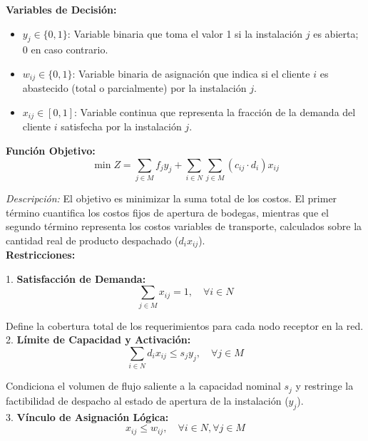 \documentclass[letter, 10pt]{article}
\begin{document}
\textbf{Variables de Decisión:}
\begin{itemize}
    \item $y_j \in \{0, 1\}$: Variable binaria que toma el valor 1 si la instalación $j$ es abierta; 0 en caso contrario.
    \item $w_{ij} \in \{0, 1\}$: Variable binaria de asignación que indica si el cliente $i$ es abastecido (total o parcialmente) por la instalación $j$.
    \item $x_{ij} \in [0, 1]$: Variable continua que representa la fracción de la demanda del cliente $i$ satisfecha por la instalación $j$.
\end{itemize}

\textbf{Función Objetivo:}
\begin{equation}
    \min Z = \sum_{j \in M} f_j y_j + \sum_{i \in N} \sum_{j \in M} (c_{ij} \cdot d_i) x_{ij}
\end{equation}

\textit{Descripción:} El objetivo es minimizar la suma total de los costos. El primer término cuantifica los costos fijos de apertura de bodegas, mientras que el segundo término representa los costos variables de transporte, calculados sobre la cantidad real de producto despachado ($d_i x_{ij}$).\\

\textbf{Restricciones:}

1. \textbf{Satisfacción de Demanda:} 
\begin{equation}
    \sum_{j \in M} x_{ij} = 1, \quad \forall i \in N
\end{equation}

Define la cobertura total de los requerimientos para cada nodo receptor en la red.\\

2. \textbf{Límite de Capacidad y Activación:} 
\begin{equation}
    \sum_{i \in N} d_i x_{ij} \leq s_j y_j, \quad \forall j \in M
\end{equation}

Condiciona el volumen de flujo saliente a la capacidad nominal $s_j$ y restringe la factibilidad de despacho al estado de apertura de la instalación ($y_j$).\\

3. \textbf{Vínculo de Asignación Lógica:} 
\begin{equation}
    x_{ij} \leq w_{ij}, \quad \forall i \in N, \forall j \in M
\end{equation}
\end{document}

